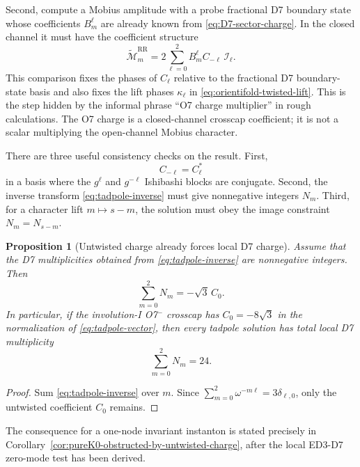 \documentclass[11pt]{article}
\newcommand{\RR}{\mathrm{RR}}
\newtheorem{proposition}{Proposition}
\begin{document}
Second, compute a Mobius amplitude with a probe fractional D7 boundary state whose coefficients
$B_m^\ell$ are already known from \eqref{eq:D7-sector-charge}. In the closed channel it must have
the coefficient structure
\begin{equation}
  \widetilde{\mathcal M}_{m}^{\RR}
  =
  2\sum_{\ell=0}^{2} B_m^\ell C_{-\ell}\,\mathcal I_\ell.
  \label{eq:probe-mobius-factorization}
\end{equation}
This comparison fixes the phases of $C_\ell$ relative to the fractional D7 boundary-state basis
and also fixes the lift phases $\kappa_\ell$ in \eqref{eq:orientifold-twisted-lift}. This is the
step hidden by the informal phrase ``O7 charge multiplier'' in rough calculations. The O7 charge
is a closed-channel crosscap coefficient; it is not a scalar multiplying the open-channel Mobius
character.

There are three useful consistency checks on the result. First,
\begin{equation}
  C_{-\ell}=C_\ell^*
  \label{eq:crosscap-reality}
\end{equation}
in a basis where the $g^\ell$ and $g^{-\ell}$ Ishibashi blocks are conjugate. Second, the inverse
transform \eqref{eq:tadpole-inverse} must give nonnegative integers $N_m$. Third, for a character
lift $m\mapsto s-m$, the solution must obey the image constraint $N_m=N_{s-m}$.

\begin{proposition}[Untwisted charge already forces local D7 charge]
Assume that the D7 multiplicities obtained from \eqref{eq:tadpole-inverse} are nonnegative
integers. Then
\begin{equation}
  \sum_{m=0}^{2}N_m=-\sqrt{3}\,C_0.
  \label{eq:total-D7-from-C0}
\end{equation}
In particular, if the involution-I O7$^-$ crosscap has $C_0=-8\sqrt{3}$ in the normalization of
\eqref{eq:tadpole-vector}, then every tadpole solution has total local D7 multiplicity
\begin{equation}
  \sum_{m=0}^{2}N_m=24.
  \label{eq:total-D7-o7minus}
\end{equation}
\end{proposition}

\begin{proof}
Sum \eqref{eq:tadpole-inverse} over $m$. Since
$\sum_{m=0}^{2}\omega^{-m\ell}=3\delta_{\ell,0}$, only the untwisted coefficient $C_0$ remains.
\end{proof}

The consequence for a one-node invariant instanton is stated precisely in
Corollary~\ref{cor:pureK0-obstructed-by-untwisted-charge}, after the local ED3-D7 zero-mode
test has been derived.
\end{document}
